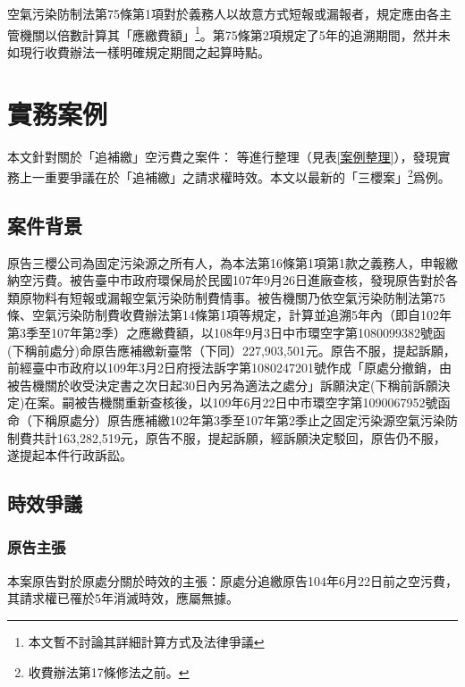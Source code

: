 \documentclass[11pt,a4paper]{article}
\begin{document}
空氣污染防制法第75條第1項對於義務人以故意方式短報或漏報者，規定應由各主管機關以倍數計算其「應繳費額」\footnote{本文暫不討論其詳細計算方式及法律爭議}。第75條第2項規定了5年的追溯期間，然并未如現行收費辦法一樣明確規定期間之起算時點。








\section{實務案例}



本文針對關於「追補繳」空污費之案件：
等進行整理（見表\ref{案例整理}），發現實務上一重要爭議在於「追補繳」之請求權時效。本文以最新的「三櫻案」\footnote{收費辦法第17條修法之前。}爲例。



\subsection{案件背景}

原告三櫻公司為固定污染源之所有人，為本法第16條第1項第1款之義務人，申報繳納空污費。被告臺中市政府環保局於民國107年9月26日進廠查核，發現原告對於各類原物料有短報或漏報空氣污染防制費情事。被告機關乃依空氣污染防制法第75條、空氣污染防制費收費辦法第14條第1項等規定，計算並追溯5年內（即自102年第3季至107年第2季）之應繳費額，以108年9月3日中市環空字第1080099382號函(下稱前處分)命原告應補繳新臺幣（下同）227,903,501元。原告不服，提起訴願，前經臺中市政府以109年3月2日府授法訴字第1080247201號作成「原處分撤銷，由被告機關於收受決定書之次日起30日內另為適法之處分」訴願決定(下稱前訴願決定)在案。嗣被告機關重新查核後，以109年6月22日中市環空字第1090067952號函命（下稱原處分）原告應補繳102年第3季至107年第2季止之固定污染源空氣污染防制費共計163,282,519元，原告不服，提起訴願，經訴願決定駁回，原告仍不服，遂提起本件行政訴訟。

\subsection{時效爭議}
\subsubsection{原告主張}
本案原告對於原處分關於時效的主張：原處分追繳原告104年6月22日前之空污費，其請求權已罹於5年消滅時效，應屬無據。
\end{document}
